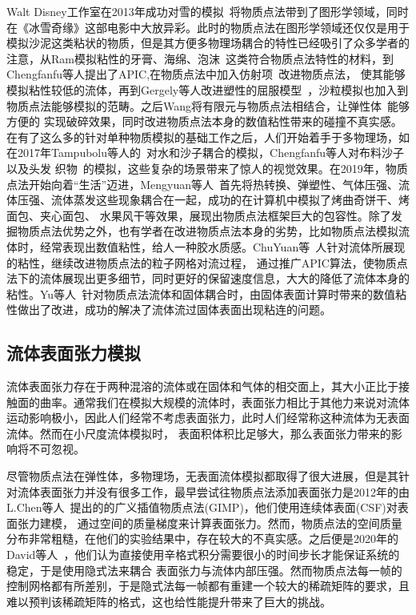 Walt Disney工作室在2013年成功对雪的模拟~\cite{stomakhin2013material}将物质点法带到了图形学领域，同时在《冰雪奇缘》这部电影中大放异彩。此时的物质点法在图形学领域还仅仅是用于
模拟沙泥这类粘状的物质，但是其方便多物理场耦合的特性已经吸引了众多学者的注意，从Ram模拟粘性的牙膏、海绵、泡沫~\cite{2015foams}这类符合物质点法特性的材料，到Chengfanfu等人提出了APIC,在物质点法中加入仿射项~\cite{jiang2015affine}改进物质点法，
使其能够模拟粘性较低的流体，再到Gergely等人改进塑性的屈服模型~\cite{klar2016drucker}，沙粒模拟也加入到物质点法能够模拟的范畴。之后Wang将有限元与物质点法相结合，让弹性体~\cite{2019WangDuctile}能够方便的
实现破碎效果，同时改进物质点法本身的数值粘性带来的碰撞不真实感。在有了这么多的针对单种物质模拟的基础工作之后，人们开始着手于多物理场，如在2017年Tampubolu等人的~\cite{tampubolon2017multi}对水和沙子耦合的模拟，Chengfanfu等人对布料沙子以及头发
织物~\cite{jiang2017anisotropic}的模拟，这些复杂的场景带来了惊人的视觉效果。在2019年，物质点法开始向着“生活”迈进，Mengyuan等人~\cite{Ding2019}首先将热转换、弹塑性、气体压强、流体压强、流体蒸发这些现象耦合在一起，成功的在计算机中模拟了烤曲奇饼干、烤面包、夹心面包、
水果风干等效果，展现出物质点法框架巨大的包容性。除了发掘物质点法优势之外，也有学者在改进物质点法本身的劣势，比如物质点法模拟流体时，经常表现出数值粘性，给人一种胶水质感。ChuYuan等~\cite{fu2017polynomial}人针对流体所展现的粘性，继续改进物质点法的粒子网格对流过程，
通过推广APIC算法，使物质点法下的流体展现出更多细节，同时更好的保留速度信息，大大的降低了流体本身的粘性。Yu等人~\cite{fang2020iq}针对物质点法流体和固体耦合时，由固体表面计算时带来的数值粘性做出了改进，成功的解决了流体流过固体表面出现粘连的问题。

\subsection{流体表面张力模拟}
流体表面张力存在于两种混溶的流体或在固体和气体的相交面上，其大小正比于接触面的曲率。通常我们在模拟大规模的流体时，表面张力相比于其他力来说对流体运动影响极小，因此人们经常不考虑表面张力，此时人们经常称这种流体为无表面流体。然而在小尺度流体模拟时，
表面积体积比足够大，那么表面张力带来的影响将不可忽视。

尽管物质点法在弹性体，多物理场，无表面流体模拟都取得了很大进展，但是其针对流体表面张力并没有很多工作，最早尝试往物质点法添加表面张力是2012年的由L.Chen等人~\cite{chen2012modeling}提出的的广义插值物质点法(GIMP)，他们使用连续体表面(CSF)对表面张力建模，
通过空间的质量梯度来计算表面张力。然而，物质点法的空间质量分布非常粗糙，在他们的实验结果中，存在较大的不真实感。之后便是2020年的David等人~\cite{hyde2020implicit}，他们认为直接使用辛格式积分需要很小的时间步长才能保证系统的稳定，于是使用隐式法来耦合
表面张力与流体内部压强。然而物质点法每一帧的控制网格都有所差别，于是隐式法每一帧都有重建一个较大的稀疏矩阵的要求，且难以预判该稀疏矩阵的格式，这也给性能提升带来了巨大的挑战。


